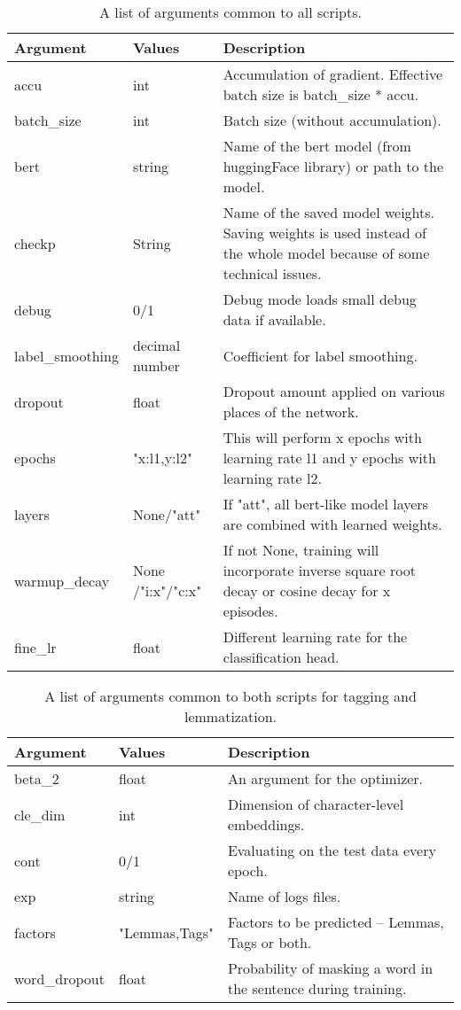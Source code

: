\begin{table}
\begin{tabular}{ |p{3cm}|p{}|p{6cm}| } 
 \hline
 Argument & Values & Description \\ 
 \hline \hline
 accu & int & Accumulation of gradient. Effective batch size is batch\_size * accu.  \\\hline
batch\_size & int & Batch size (without accumulation). \\ \hline
bert & string & Name of the bert model (from huggingFace library) or path to the model.  \\ \hline
  checkp & String & Name of the saved model weights. Saving weights is used instead of the whole model because of some technical issues.  \\ \hline
  debug & 0/1 & Debug mode loads small debug data if available. \\ \hline
  label\_smoothing & decimal number & Coefficient for label smoothing. \\ \hline
  dropout & float &  Dropout amount applied on various places of the network.  \\ \hline
 epochs & "x:l1,y:l2"  & This will perform x epochs with learning rate l1 and y epochs with learning rate l2.   \\ \hline
 layers & None/"att" & If "att", all bert-like model layers are combined with learned weights.  \\ \hline
 warmup\_decay & None /"i:x"/"c:x" & If not None, training will incorporate inverse square root decay or cosine decay for x episodes.  \\ \hline
 fine\_lr & float & Different learning rate for the classification head.  \\ \hline
 \hline
\end{tabular}
\caption{A list of arguments common to all scripts.} 
\label{Tab:com_args}
\end{table}


\begin{table}
\centering
\begin{tabular}{ |p{3cm}|p{}|p{6cm}| } 
 \hline
 Argument & Values & Description \\ 
 \hline \hline
 beta\_2 & float & An argument for the optimizer. \\ \hline
 cle\_dim & int & Dimension of character-level embeddings.  \\ \hline
 cont & 0/1 & Evaluating on the test data every epoch.  \\ \hline
 exp & string & Name of logs files.  \\ \hline
 factors & "Lemmas,Tags" & Factors to be predicted -- Lemmas, Tags or both. \\ \hline
word\_dropout & float & Probability of masking a word in the sentence during training.  \\ \hline

\hline

\end{tabular}
\caption{A list of arguments common to both scripts for tagging and lemmatization.} 
\label{Tab:mt_com_args}
\end{table}


